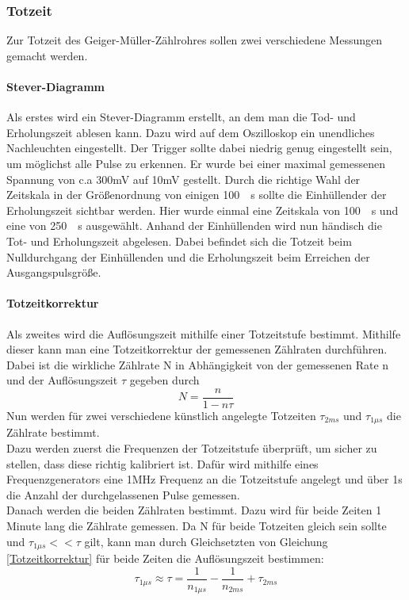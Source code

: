 \documentclass[12pt,a4paper]{article}
\begin{document}
\subsubsection{Totzeit}
Zur Totzeit des Geiger-Müller-Zählrohres sollen zwei verschiedene Messungen gemacht werden.
\paragraph{Stever-Diagramm}
Als erstes wird ein Stever-Diagramm erstellt, an dem man die Tod- und Erholungszeit ablesen kann. Dazu wird auf dem Oszilloskop ein unendliches Nachleuchten eingestellt. Der Trigger sollte dabei niedrig genug eingestellt sein, um möglichst alle Pulse zu erkennen. Er wurde bei einer maximal gemessenen Spannung von c.a 300mV auf 10mV gestellt. Durch die richtige Wahl der Zeitskala in der Größenordnung von einigen \SI{100}{\mu s} sollte die Einhüllender der Erholungszeit sichtbar werden. Hier wurde einmal eine Zeitskala von \SI{100}{\mu s} und eine von \SI{250}{\mu s} ausgewählt. Anhand der Einhüllenden wird nun händisch die Tot- und Erholungszeit abgelesen. Dabei befindet sich die Totzeit beim Nulldurchgang der Einhüllenden und die Erholungszeit beim Erreichen der Ausgangspulsgröße. 

\paragraph{Totzeitkorrektur}
Als zweites wird die Auflösungszeit mithilfe einer Totzeitstufe bestimmt. Mithilfe dieser kann man eine Totzeitkorrektur der gemessenen Zählraten durchführen. Dabei ist die wirkliche Zählrate N in Abhängigkeit von der gemessenen Rate n und der Auflösungszeit $\tau$ gegeben durch 
\begin{equation}
\label{Totzeitkorrektur}
N = \dfrac{n}{1-n\tau}
\end{equation}
Nun werden für zwei verschiedene künstlich angelegte Totzeiten $\tau_{2ms}$ und $\tau_{1\mu s}$ die Zählrate bestimmt.\\Dazu werden zuerst die Frequenzen der Totzeitstufe überprüft, um sicher zu stellen, dass diese richtig kalibriert ist. Dafür wird mithilfe eines Frequenzgenerators eine 1MHz Frequenz an die Totzeitstufe angelegt und über 1s die Anzahl der durchgelassenen Pulse gemessen.\\
Danach werden die beiden Zählraten bestimmt. Dazu wird für beide Zeiten 1 Minute lang die Zählrate gemessen. Da N für beide Totzeiten gleich sein sollte und $\tau_{1\mu s} << \tau$ gilt, kann man durch Gleichsetzten von Gleichung \ref{Totzeitkorrektur} für beide Zeiten die Auflösungszeit bestimmen:
\begin{equation}
\tau_{1\mu s} \approx \tau = \dfrac{1}{n_{1\mu s}} - \dfrac{1}{n_{2ms}} + \tau_{2ms}
\label{Auslosungszeit}
\end{equation}
\end{document}
